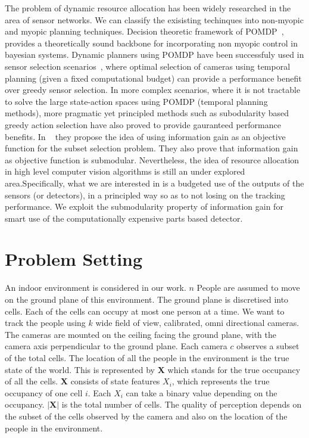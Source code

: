 \documentclass[10pt,twocolumn,letterpaper]{article}
\begin{document}
The problem of dynamic resource allocation has been widely researched in the area of sensor networks. We can classify the exisisting techinques into non-myopic and myopic planning techniques.  Decision theoretic framework of POMDP~\cite{Kaelbling98}, provides a theoretically sound backbone for incorporating non myopic control in bayesian systems. Dynamic planners using POMDP have been successfuly used in sensor selection scenarios~\cite{Spaan09}, where optimal selection of cameras using temporal planning (given a  fixed computational budget) can provide a performance benefit over greedy sensor selection. In more complex scenarios, where it is not tractable to solve the large state-action spaces using POMDP (temporal planning methods), more pragmatic yet principled methods such as subodularity based greedy action selection have also proved to provide gauranteed performance benefits. In ~\cite{krause2012near} they propose the idea of using information gain as an objective function for the subset selection problem. They also prove that information gain as objective function is submodular. Nevertheless, the idea of resource allocation in high level computer vision algorithms is still an under explored area.Specifically, what we are interested in is a budgeted use of the outputs of the sensors (or detectors), in a principled way so as to not losing on the tracking performance. We exploit the submodularity property of information gain for smart use of the computationally expensive parts based detector.


\section{Problem Setting}

An indoor environment is considered in our work. $ n$ People are assumed to move on the ground plane of this environment. The ground plane is discretised into cells. Each of the cells can occupy at most one person at a time. We want to track the people using $ k $ wide field of view, calibrated, omni directional cameras. The cameras are mounted on the ceiling facing the ground plane, with the camera axis perpendicular to the ground plane. Each camera $ c $ observes a subset of the total cells.  The location of all the people in the environment is the true state of the world. This is represented by  \textbf{X} which stands for the true occupancy of all the cells. \textbf{X} consists of state features $X_{i}$, which represents the true occupancy of one cell $ i$. Each $X_{i}$ can take a binary value depending on the occupancy. $|\textbf{X}| $ is the total number of cells. The quality of perception depends on the subset of the cells observed by the camera and also on the location of the people in the environment.
\end{document}
